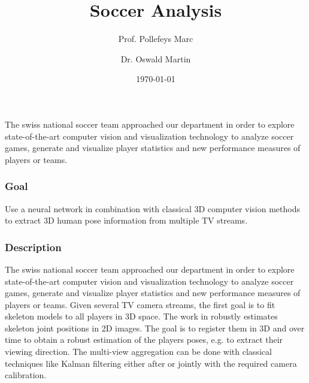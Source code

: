 \documentclass[]{article}
\title{Soccer Analysis}
\author{
	Prof. Pollefeys Marc\\
	\and
	Dr. Oswald Martin\\
}
\date{\today}
\begin{document}
\maketitle

The swiss national soccer team approached our department in order to explore state-of-the-art computer vision and visualization technology to analyze soccer games, generate and visualize player statistics and new performance measures of players or teams.

\subsubsection*{Goal}
Use a neural network in combination with classical 3D computer vision methods to extract 3D human pose information from multiple TV streams.


\subsubsection*{Description}
The swiss national soccer team approached our department in order to explore state-of-the-art computer vision and visualization technology to analyze soccer games, generate and visualize player statistics and new performance measures of players or teams. Given several TV camera streams, the first goal is to fit skeleton models to all players in 3D space. The work in robustly estimates skeleton joint positions in 2D images. The goal is to register them in 3D and over time to obtain a robust estimation of the players poses, e.g. to extract their viewing direction. The multi-view aggregation can be done with classical techniques like Kalman filtering either after or jointly with the required camera calibration.
\end{document}
